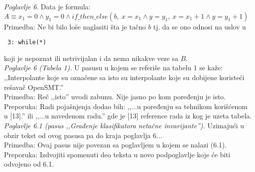 \documentclass[a4paper]{report}
\begin{document}
\textit{Poglavlje 6}. Data je formula: \\ 
$A \equiv x_1 = 0 \land y_1 = 0 \land if\_then\_else(b,\ x = x_1 \land y = y_1,\ x = x_1 + 1 \land y = y_1 + 1)$ \\
\indent Primedba: Ne bi bilo loše naglasiti šta je tačno $b$ tj. da se ono odnosi na uslov u \begin{verbatim} 3: while(*) \end{verbatim} koji je nepoznat ili netrivijalan i da nema nikakve veze sa $B$. \\

\textit{Poglavlje 6 (Tabela 1).} U pasusu u kojem se referiše na tabelu 1 se kaže: ,,Interpolante koje su označene sa isto su interpolante koje su dobijene koristeći rešavač OpenSMT.'' \\
\indent Primedba: Reč ,,isto'' uvodi zabunu. Nije jasno po kom poređenju je isto. \\
\indent Preporuka: Radi pojašnjenja dodao bih: ,,...u poređenju sa tehnikom korišćenom u [13].'' ili ,,...u navedenom radu.'' gde je [13] reference rada iz kog je uzeta tabela. \\

\textit{Poglavlje 6.1 (pasus ,,Građenje klasifikatora netačne invarijante'').} Uzimajući u obzir tekst od ovog pasusa pa do kraja poglavlja 6... \\
\indent Primedba: Ovaj pasus nije povezan sa poglavljem u kojem se nalazi (6.1). \\
\indent Preporuka: Izdvojiti spomenuti deo teksta u novo podpoglavlje koje će biti odvojeno od 6.1. \\
\end{document}
